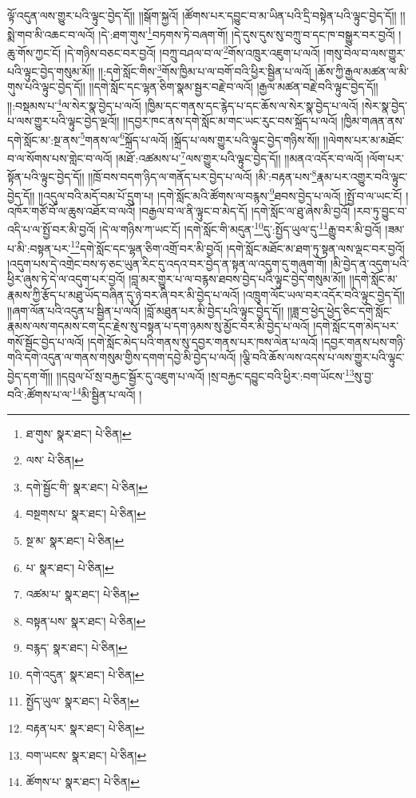 ལྟོ་འདུན་ལས་གྱུར་པའི་ལྟུང་བྱེད་དོ།། །།སྒོག་སྐྱའོ། །ཚོགས་པར་དབྱུང་བ་མ་ཡིན་པའི་དྲི་བསྟེན་པའི་ལྟུང་བྱེད་དོ།། །།སྨེ་གབ་མི་འཆང་བ་ལའོ། །དེ་:ཐག་གུས་\footnote{ཐ་གུས་  སྣར་ཐང་།  པེ་ཅིན། }བཏགས་ཏེ་བཞག་གོ། །དེ་དུས་དུས་སུ་བཀྲུ་བ་དང་ཁ་བསྒྱུར་བར་བྱའོ། །ཆུ་གོས་ཀྱང་ངོ། །དེ་གཉིས་བཅང་བར་བྱའོ། །བཀྲུ་བཤལ་བ་ལ་\footnote{ལས་  པེ་ཅིན། }གོས་འཁྲུར་འཇུག་པ་ལའོ། །གསུ་བེལ་བ་ལས་གྱུར་པའི་ལྟུང་བྱེད་གསུམ་མོ།། །།:དགེ་སློང་གིས་\footnote{དགེ་སྦྱོང་གི་  སྣར་ཐང་།  པེ་ཅིན། }གོས་ཁྱིམ་པ་ལ་བགོ་བའི་ཕྱིར་སྦྱིན་པ་ལའོ། །ཆོས་ཀྱི་རྒྱལ་མཚན་ལ་མི་གུས་པའི་ལྟུང་བྱེད་དོ།། །།དགེ་སློང་དང་ལྷན་ཅིག་སྣམ་སྦྱར་བརྗེ་བ་ལའོ། །རྒྱལ་མཚན་བརྗེ་བའི་ལྟུང་བྱེད་དོ།། །།:བསྡམས་པ་\footnote{བསྔགས་པ་  སྣར་ཐང་།  པེ་ཅིན། }ལ་སེར་སྣ་བྱེད་པ་ལའོ། །ཁྱིམ་དང་གནས་དང་རྙེད་པ་དང་ཆོས་ལ་སེར་སྣ་བྱེད་པ་ལའོ། །སེར་སྣ་བྱེད་པ་ལས་གྱུར་པའི་ལྟུང་བྱེད་ལྔའོ།། །།དབྱར་ཁང་ནས་དགེ་སློང་མ་གང་ཡང་རུང་བས་སྐྲོད་པ་ལའོ། །ཁྱིམ་གཞན་ནས་དགེ་སློང་མ་:སྔ་ནས་\footnote{སྔ་མ་  སྣར་ཐང་།  པེ་ཅིན། }གནས་ལ་\footnote{པ་  སྣར་ཐང་།  པེ་ཅིན། }སྐྲོད་པ་ལའོ། །སྐྲོད་པ་ལས་གྱུར་པའི་ལྟུང་བྱེད་གཉིས་སོ།། །།ལེགས་པར་མ་མཐོང་བ་ལ་སོགས་པས་གླེང་བ་ལའོ། །མཐོ་:འཚམས་པ་\footnote{འཚམ་པ་  སྣར་ཐང་།  པེ་ཅིན། }ལས་གྱུར་པའི་ལྟུང་བྱེད་དོ།། །།མནའ་འདོར་བ་ལའོ། །ལོག་པར་སྟོན་པའི་ལྟུང་བྱེད་དོ།། །།ཁྲོ་བས་བདག་ཉིད་ལ་གནོད་པར་བྱེད་པ་ལའོ། །མི་:བརྟན་པས་\footnote{བསྟན་པས་  སྣར་ཐང་།  པེ་ཅིན། }རྣམ་པར་འགྱུར་བའི་ལྟུང་བྱེད་དོ།། །།འདུལ་བའི་མདོ་བམ་པོ་དྲུག་པ། །དགེ་སློང་མའི་ཚོགས་ལ་བརྙས་\footnote{བརྙད་  སྣར་ཐང་།  པེ་ཅིན། }ཐབས་བྱེད་པ་ལའོ། །སྤྱོ་བ་ལ་ཡང་ངོ། །འཁོར་གཙོ་བོ་ལ་ཆུས་འཐོར་བ་ལའོ། །བརྒྱལ་བ་ལ་ནི་ལྟུང་བ་མེད་དོ། །དགེ་སློང་ལ་ཐུ་ཞེས་མི་བྱའོ། །རབ་ཏུ་བྱུང་བ་འདི་པ་ལ་སྤྱོ་བར་མི་བྱའོ། །དེ་ལ་གཉིས་ཀ་ཡང་ངོ། །དགེ་སློང་གི་མདུན་\footnote{དགེ་འདུན་  སྣར་ཐང་།  པེ་ཅིན། }དུ་:སྤྱོད་ཡུལ་དུ་\footnote{སྤྱོད་ཡུལ་  སྣར་ཐང་།  པེ་ཅིན། }རྒྱུ་བར་མི་བྱའོ། །ཟམ་པ་མི་:བསྟན་པར་\footnote{བརྟན་པར་  སྣར་ཐང་།  པེ་ཅིན། }དགེ་སློང་དང་ལྷན་ཅིག་འགྲོ་བར་མི་བྱའོ། །དགེ་སློང་མཐོང་མ་ཐག་ཏུ་སྟན་ལས་ལྡང་བར་བྱའོ། །འདུག་པས་དེ་འགྲེང་བས་ཧ་ཅང་ཡུན་རིང་དུ་འདའ་བར་བྱེད་ན་སྟན་ལ་འདུག་དུ་གཞུག་གོ། །མི་བྱེད་ན་འདུག་པའི་ཕྱིར་ཞུས་ཏེ་དེ་ལ་འདུག་པར་བྱའོ། །བླ་མར་གྱུར་པ་ལ་བརྙས་ཐབས་བྱེད་པའི་ལྟུང་བྱེད་གསུམ་མོ།། །།དགེ་སློང་མ་རྣམས་ཀྱི་རྩོད་པ་མཐུ་ཡོད་བཞིན་དུ་ཉེ་བར་ཞི་བར་མི་བྱེད་པ་ལའོ། །འཁྲུག་ལོང་ཡལ་བར་འདོར་བའི་ལྟུང་བྱེད་དོ།། །།ཞག་ལོན་པའི་འདུན་པ་སྦྱིན་པ་ལའོ། །བློ་མཐུན་པར་མི་བྱེད་པའི་ལྟུང་བྱེད་དོ།། །།ཟླ་བ་ཕྱེད་ཕྱེད་ཅིང་དགེ་སློང་རྣམས་ལས་གདམས་ངག་དང་རྗེས་སུ་བསྟན་པ་དག་ཉམས་སུ་མྱོང་བར་མི་བྱེད་པ་ལའོ། །དགེ་སློང་དག་མེད་པར་གསོ་སྦྱོང་བྱེད་པ་ལའོ། །དགེ་སློང་མེད་པའི་གནས་སུ་དབྱར་གནས་པར་ཁས་ལེན་པ་ལའོ། །དབྱར་གནས་པས་གཉི་གའི་དགེ་འདུན་ལ་གནས་གསུམ་གྱིས་དགག་དབྱེ་མི་བྱེད་པ་ལའོ། །ལྕི་བའི་ཆོས་ལས་འདས་པ་ལས་གྱུར་པའི་ལྟུང་བྱེད་དག་གོ།། །།དབུལ་པོ་སྲ་བརྐྱང་སྦྱོར་དུ་འཇུག་པ་ལའོ། །སྲ་བརྐྱང་དབྱུང་བའི་ཕྱིར་:བག་ཡོངས་\footnote{བག་ཡངས་  སྣར་ཐང་།  པེ་ཅིན། }སུ་བྱ་བའི་:ཚོགས་པ་ལ་\footnote{ཚོགས་པ་  སྣར་ཐང་།  པེ་ཅིན། }མི་སྦྱིན་པ་ལའོ། །
